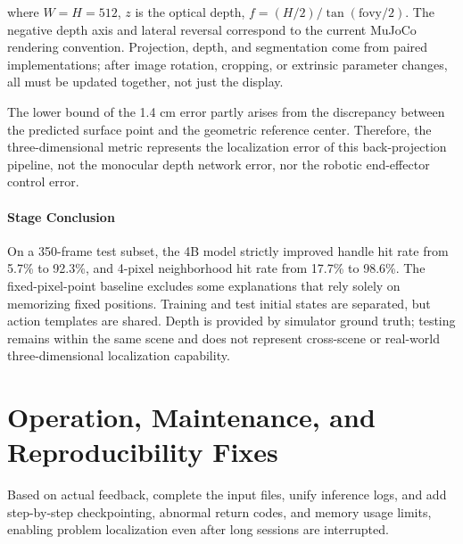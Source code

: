 where \(W=H=512\), \(z\) is the optical depth, \(f=(H/2)/\tan(\mathrm{fovy}/2)\). The negative depth axis and lateral reversal correspond to the current MuJoCo rendering convention. Projection, depth, and segmentation come from paired implementations; after image rotation, cropping, or extrinsic parameter changes, all must be updated together, not just the display.

The lower bound of the 1.4 cm error partly arises from the discrepancy between the predicted surface point and the geometric reference center. Therefore, the three-dimensional metric represents the localization error of this back-projection pipeline, not the monocular depth network error, nor the robotic end-effector control error.



\paragraph{Stage Conclusion} On a 350-frame test subset, the 4B model strictly improved handle hit rate from 5.7\% to 92.3\%, and 4-pixel neighborhood hit rate from 17.7\% to 98.6\%. The fixed-pixel-point baseline excludes some explanations that rely solely on memorizing fixed positions. Training and test initial states are separated, but action templates are shared. Depth is provided by simulator ground truth; testing remains within the same scene and does not represent cross-scene or real-world three-dimensional localization capability.


\FloatBarrier

\section{Operation, Maintenance, and Reproducibility Fixes}

\label{stage:s18}

Based on actual feedback, complete the input files, unify inference logs, and add step-by-step checkpointing, abnormal return codes, and memory usage limits, enabling problem localization even after long sessions are interrupted.

